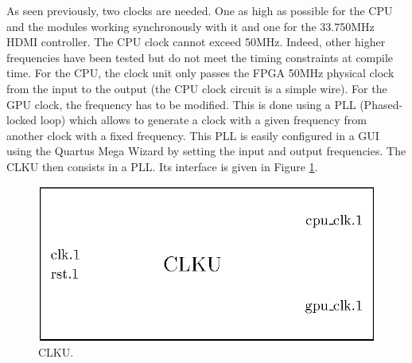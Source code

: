 As seen previously, two clocks are needed. One as high as possible for the CPU and the modules 
working synchronously with it and one for the 33.750MHz HDMI controller. The CPU clock cannot 
exceed 50MHz. Indeed, other higher frequencies have been tested but do not meet the timing 
constraints at compile time. For the CPU, the clock unit only passes the FPGA 50MHz physical clock 
from the input to the output (the CPU clock circuit is a simple wire). For the GPU clock, the frequency
has to be modified. This is done 
using a PLL (Phased-locked loop) which allows to generate a clock with a given frequency from 
another clock with a fixed frequency. This PLL is easily configured in a GUI using the Quartus 
Mega Wizard by setting the input and output frequencies. The CLKU then consists in a PLL. Its interface 
is given in Figure \ref{fig:clku/clku}.

\begin{figure}[H]
    \centering
    \includegraphics[scale=1.0]{Chapter4-GPU_CLKU/res/clku}
    \caption{CLKU.}
    \label{fig:clku/clku}
\end{figure}
